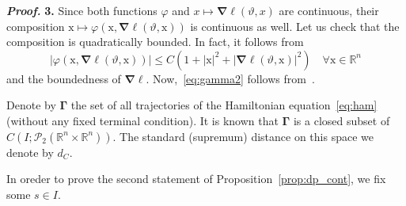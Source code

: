 \documentclass[sn-mathphys-num]{sn-jnl}
\numberwithin{equation}{section}
\theoremstyle{mythm}
\theoremstyle{mydef}
\renewenvironment{proof}{\smallskip\noindent\emph{\textbf{Proof.}}%
  \hspace{1pt}}{\hspace{-5pt}{\nobreak\quad\nobreak\hfill\nobreak%
    $\square$\vspace{2pt}\par}\smallskip\goodbreak}
\renewcommand{\phi}{\varphi}
\begin{document}
\begin{proof}
\textbf{3.} Since both functions \( \varphi \) and \( x\mapsto \bm \nabla \ell(\vartheta,x) \) are continuous, their composition \( \mathrm{x}\mapsto \phi \left( \mathrm{x}, \bm\nabla \ell\left(\vartheta,\mathrm{x}\right)\right) \)  is continuous as well.
  Let us check that the composition is quadratically bounded.
  In fact, it follows from
  \[
    \left|\varphi \left( \mathrm{x}, \bm\nabla \ell\left(\vartheta,\mathrm{x}\right)\right)   \right|\le C \left( 1+ |\mathrm{x}|^2 + \left|\bm\nabla \ell\left(\vartheta,\mathrm{x}\right)\right|^2 \right) \quad \forall \mathrm{x}\in \mathbb{R}^n
   \]
   and the boundedness of \( \bm \nabla \ell \).
   Now,~\eqref{eq:gamma2} follows from~\cite[Theorem 6.9]{zbMATH05306371}.
 \end{proof}

 Denote by \( \bm \Gamma \) the set of all trajectories of the Hamiltonian equation~\eqref{eq:ham} (without any fixed terminal condition).
 It is known that \( \bm \Gamma \) is a closed subset of \( C\left(I;\mathcal{P}_2(\mathbb{R}^n \times \mathbb{R}^n)\right) \).
 The standard (supremum) distance on this space we denote by \( d_{C} \).

 In oreder to prove the second statement of Proposition~\ref{prop:dp_cont}, we fix some \( s\in I \). 
\end{document}
